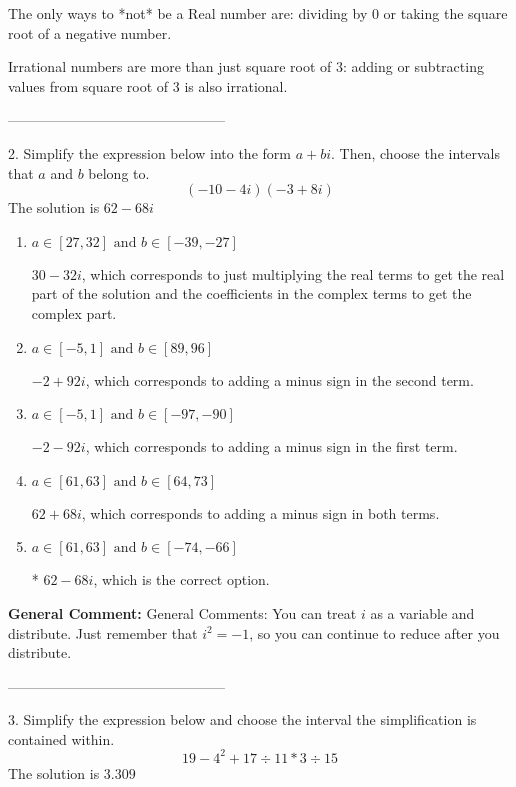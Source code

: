 \documentclass{extbook}[14pt]
\begin{document}
 The only ways to *not* be a Real number are: dividing by 0 or taking the square root of a negative number. 
 
 Irrational numbers are more than just square root of 3: adding or subtracting values from square root of 3 is also irrational. 

-----------------------------------------------

2. Simplify the expression below into the form $a+bi$. Then, choose the intervals that $a$ and $b$ belong to.
\[ (-10  - 4 i)(-3  + 8 i) \] 
The solution is $ 62  - 68 i $ 

\begin{enumerate}[label=\Alph*.] 
\item $ a \in [27, 32] \text{ and } b \in [-39, -27] $ 

  $30  - 32 i$, which corresponds to just multiplying the real terms to get the real part of the solution and the coefficients in the complex terms to get the complex part. 
\item $ a \in [-5, 1] \text{ and } b \in [89, 96] $ 

  $-2  + 92 i$, which corresponds to adding a minus sign in the second term. 
\item $ a \in [-5, 1] \text{ and } b \in [-97, -90] $ 

  $-2  - 92 i$, which corresponds to adding a minus sign in the first term. 
\item $ a \in [61, 63] \text{ and } b \in [64, 73] $ 

  $62  + 68 i$, which corresponds to adding a minus sign in both terms. 
\item $ a \in [61, 63] \text{ and } b \in [-74, -66] $ 

 * $62  - 68 i$, which is the correct option. 
\end{enumerate} 
 
\textbf{General Comment:} General Comments: You can treat $i$ as a variable and distribute. Just remember that $i^2=-1$, so you can continue to reduce after you distribute. 

-----------------------------------------------

3. Simplify the expression below and choose the interval the simplification is contained within.
\[ 19 - 4^2 + 17 \div 11 * 3 \div 15 \] 
The solution is $ 3.309 $ 
\end{document}
